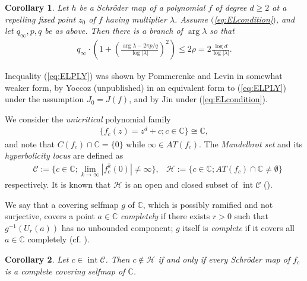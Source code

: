 \documentclass[a4paper,12pt]{amsart}
\theoremstyle{plain}
\newtheorem{maincoro}{Corollary}
\theoremstyle{definition}
\theoremstyle{remark}
\numberwithin{equation}{section}
\begin{document}
\begin{maincoro}\label{th:PLY}
Let $h$ be a Schr\"oder map of a polynomial $f$ of degree $d\ge 2$
at a repelling fixed point $z_0$ of $f$ having multiplier $\lambda$.
Assume $($\ref{eq:ELcondition}$)$, and let $q_{\infty},p,q$ be as above. Then 
there is a branch of $\arg\lambda$ so that
\begin{gather}
 q_{\infty}\cdot\left(1+\left(\frac{\arg\lambda-2\pi p/q}{\log|\lambda|}\right)^2\right)\le 2\rho=2\frac{\log d}{\log|\lambda|}.\label{eq:ELPLY}
\end{gather}
\end{maincoro}

Inequality (\ref{eq:ELPLY}) was shown
by Pommerenke \cite{Pommerenke86} and Levin \cite{Levin91}
in somewhat weaker form,
by Yoccoz (unpublished) in an equivalent form to (\ref{eq:ELPLY})
under the assumption $J_0=J(f)$,
and by Jin \cite{Jin03} under (\ref{eq:ELcondition}).

{\smallskip {}\nopagebreak[4]}
We consider the {\itshape unicritical} polynomial family
\begin{gather*}
 \{f_c(z)=z^d+c;c\in{\mathbb{C}}\}\cong{\mathbb{C}}, 
\end{gather*}
and note that $C(f_c)\cap{\mathbb{C}}=\{0\}$ while $\infty\in{\mathit{AT}}(f_c)$.
The {\itshape Mandelbrot set} and
its {\itshape hyperbolicity locus} are defined as
\begin{align*}
 &\mathcal{C}:=\{c\in{\mathbb{C}};\lim_{k\to\infty}|f_c^k(0)|\neq\infty\},
 &\mathcal{H}:=\{c\in{\mathbb{C}};{\mathit{AT}}(f_c)\cap{\mathbb{C}}\neq\emptyset\}
\end{align*}
respectively. It is known that $\mathcal{H}$ is an open and closed subset of 
${\operatorname{int}}\mathcal{C}$ (\cite[Theorem 4.4]{McMullen:renorm}).

We say that a covering selfmap $g$ of ${\mathbb{C}}$, 
which is possibly ramified and not surjective, 
covers a point $a\in{\mathbb{C}}$ {\itshape completely}
if there exists $r>0$ such that $g^{-1}(U_r(a))$ has no unbounded component;
$g$ itself is {\itshape complete} if it covers all $a\in{\mathbb{C}}$ completely
(cf. \cite[I.\ 21A]{AhlforsSario}).

\begin{maincoro}\label{th:hypdense}
 Let $c\in{\operatorname{int}}\mathcal{C}$. Then $c\not\in\mathcal{H}$ if and only if
 every Schr\"oder map of $f_c$ is a complete covering selfmap of ${\mathbb{C}}$.
\end{maincoro}
\end{document}
